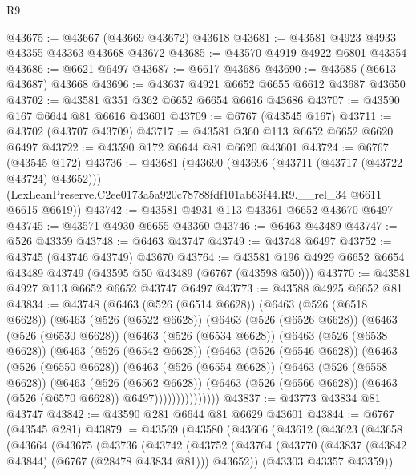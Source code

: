 \begin{lexlean}{R9}
\begin{coremodule}
@43675 := @43667 (@43669 @43672) @43618
@43681 := @43581 @4923 @4933 @43355 @43363 @43668 @43672
@43685 := @43570 @4919 @4922 @6801 @43354
@43686 := @6621 @6497
@43687 := @6617 @43686
@43690 := @43685 (@6613 @43687) @43668
@43696 := @43637 @4921 @6652 @6655 @6612 @43687 @43650
@43702 := @43581 @351 @362 @6652 @6654 @6616 @43686
@43707 := @43590 @167 @6644 @81 @6616 @43601
@43709 := @6767 (@43545 @167)
@43711 := @43702 (@43707 @43709)
@43717 := @43581 @360 @113 @6652 @6652 @6620 @6497
@43722 := @43590 @172 @6644 @81 @6620 @43601
@43724 := @6767 (@43545 @172)
@43736 := @43681
    (@43690
      (@43696 (@43711 (@43717 (@43722 @43724) @43652)))
      (LexLeanPreserve.C2ee0173a5a920c78788fdf101ab63f44.R9.__rel_34 @6611 @6615 @6619))
@43742 := @43581 @4931 @113 @43361 @6652 @43670 @6497
@43745 := @43571 @4930 @6655 @43360
@43746 := @6463 @43489
@43747 := @526 @43359
@43748 := @6463 @43747
@43749 := @43748 @6497
@43752 := @43745 (@43746 @43749) @43670
@43764 := @43581 @196 @4929 @6652 @6654 @43489 @43749 (@43595 @50 @43489 (@6767 (@43598 @50)))
@43770 := @43581 @4927 @113 @6652 @6652 @43747 @6497
@43773 := @43588 @4925 @6652 @81
@43834 := @43748
    (@6463
      (@526 (@6514 @6628))
      (@6463
        (@526 (@6518 @6628))
        (@6463
          (@526 (@6522 @6628))
          (@6463
            (@526 (@6526 @6628))
            (@6463
              (@526 (@6530 @6628))
              (@6463
                (@526 (@6534 @6628))
                (@6463
                  (@526 (@6538 @6628))
                  (@6463
                    (@526 (@6542 @6628))
                    (@6463
                      (@526 (@6546 @6628))
                      (@6463
                        (@526 (@6550 @6628))
                        (@6463
                          (@526 (@6554 @6628))
                          (@6463
                            (@526 (@6558 @6628))
                            (@6463
                              (@526 (@6562 @6628))
                              (@6463
                                (@526 (@6566 @6628))
                                (@6463 (@526 (@6570 @6628)) @6497)))))))))))))))
@43837 := @43773 @43834 @81 @43747
@43842 := @43590 @281 @6644 @81 @6629 @43601
@43844 := @6767 (@43545 @281)
@43879 := @43569
    (@43580
      (@43606
        (@43612
          (@43623
            (@43658
              (@43664
                (@43675
                  (@43736
                    (@43742
                      (@43752
                        (@43764
                          (@43770 (@43837 (@43842 @43844) (@6767 (@28478 @43834 @81))) @43652))
                        (@43303 @43357 @43359))

\end{coremodule}
\end{lexlean}

